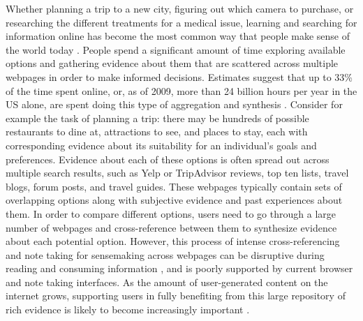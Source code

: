 Whether planning a trip to a new city, figuring out which camera to purchase, or researching the different treatments for a medical issue, learning and searching for information online has become the most common way that people make sense of the world today \cite{mar2006exp,pirolli1999information}. People spend a significant amount of time exploring available options and gathering evidence about them that are scattered across multiple webpages in order to make informed decisions.  Estimates suggest that up to 33\% of the time spent online, or, as of 2009, more than 24 billion hours per year in the US alone, are spent doing this type of aggregation and synthesis \cite{mar2006exp,kellar2007field,rose2004understanding,forrester}. Consider for example the task of planning a trip: there may be hundreds of possible restaurants to dine at, attractions to see, and places to stay, each with corresponding evidence about its suitability for an individual's goals and preferences. Evidence about each of these options is often spread out across multiple search results, such as Yelp or TripAdvisor reviews, top ten lists, travel blogs, forum posts, and travel guides. These webpages typically contain sets of overlapping options along with subjective evidence and past experiences about them. In order to compare different options, users need to go through a large number of webpages and cross-reference between them to synthesize evidence about each potential option.  However, this process of intense cross-referencing and note taking for sensemaking across webpages can be disruptive during reading and consuming information \cite{o1996towards,marshall1999introducing,tashman2011liquidtext,bianchi2015designing}, and is poorly supported by current browser and note taking interfaces. As the amount of user-generated content on the internet grows, supporting users in fully benefiting from this large repository of rich evidence is likely to become increasingly important \cite{mudambi2010research,gan2012helpfulness}.

